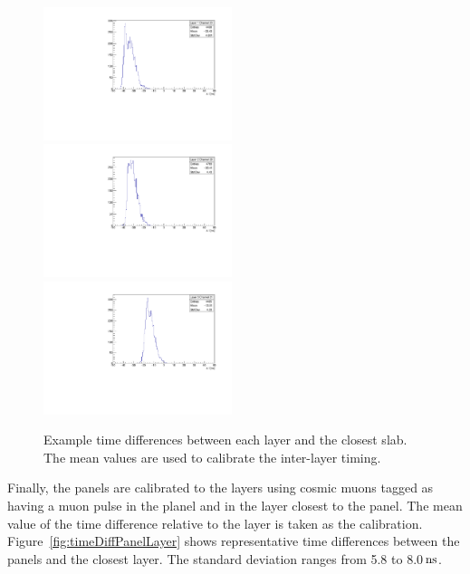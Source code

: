 \documentclass[12pt]{article}
\newcommand{\unit}[1]{\ensuremath{\text{\,#1}}\xspace}
\begin{document}
\begin{figure}
\centering
    \includegraphics[width=0.49\textwidth]{figures/timingPlots/interLayer/Layer_1_Channel_20.pdf}~
    \includegraphics[width=0.49\textwidth]{figures/timingPlots/interLayer/Layer_2_Channel_28.pdf}\\
    \includegraphics[width=0.49\textwidth]{figures/timingPlots/interLayer/Layer_3_Channel_21.pdf}
    \caption{\label{fig:timeDiffInterLayer} Example time differences between each layer and the closest slab. 
    The mean values are used to calibrate the inter-layer timing.}
\end{figure}

Finally, the panels are calibrated to the layers using cosmic muons tagged as having a muon
pulse in the planel and in the layer closest to the panel. The mean value of the time 
difference relative to the layer is taken as the calibration. Figure~\ref{fig:timeDiffPanelLayer}
shows representative time differences between the panels and the closest layer. The standard deviation ranges
from 5.8 to 8.0\unit{ns}.
\end{document}
